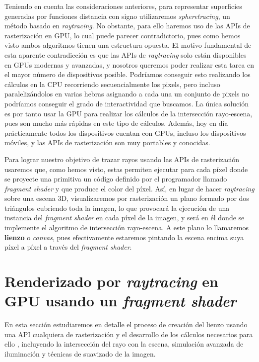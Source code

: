 Teniendo en cuenta las consideraciones anteriores, para representar superficies generadas por funciones distancia con signo  utilizaremos \textit{spheretracing}, un método basado en \textit{raytracing}. No obstante, para ello haremos uso de las APIs de rasterización en GPU, lo cual puede parecer contradictorio, pues como hemos visto ambos algoritmos tienen una estructura opuesta. El motivo fundamental de esta aparente contradicción es que las APIs de \textit{raytracing} solo están disponibles en GPUs modernas y avanzadas, y nosotros queremos poder realizar esta tarea en el mayor número de dispositivos posible. Podríamos conseguir esto realizando los cálculos en la CPU recorriendo secuencialmente los pixels, pero incluso paralelizándolos en varias hebras asignando a cada una un conjunto de pixels no podríamos conseguir el grado de interactividad que buscamos. La única solución es por tanto usar la GPU para realizar los cálculos de la intersección rayo-escena, pues son mucho más rápidas en este tipo de cálculos. Además, hoy en día prácticamente todos los dispositivos cuentan con GPUs, incluso los dispositivos móviles, y las APIs de rasterización son muy portables y conocidas. \newline

Para lograr nuestro objetivo de trazar rayos usando las APIs de rasterización usaremos que, como hemos visto, estas permiten ejecutar para cada píxel donde se proyecte una primitiva un código definido por el programador llamado \textit{fragment shader} y que produce el color del píxel. Así, en lugar de hacer \textit{raytracing} sobre una escena 3D, visualizaremos por rasterización un plano formado por dos triángulos cubriendo toda la imagen, lo que provocará la ejecución de una instancia del \textit{fragment shader} en cada píxel de la imagen, y será en él donde se implemente el algoritmo de intersección rayo-escena. A este plano lo llamaremos \textbf{lienzo} o \textit{canvas}, pues efectivamente estaremos pintando la escena encima suya píxel a píxel a través del \textit{fragment shader}.

\section{Renderizado por \textit{raytracing} en GPU usando un \textit{fragment shader}}\label{sec:render}
En esta sección estudiaremos en detalle el proceso de creación del lienzo usando una API cualquiera de rasterización y el desarrollo de los cálculos necesarios para ello , incluyendo la intersección del rayo con la escena, simulación avanzada de iluminación y técnicas de suavizado de la imagen.



